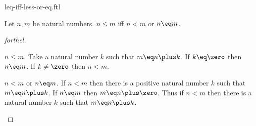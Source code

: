 \documentclass{stex}
\begin{document}
\begin{smodule}{leq-iff-less-or-eq.ftl}


\begin{proposition}[forthel,id=LeqCharacterizationProp]
  Let $n, m$ be natural numbers.
  $n \leq m$ iff $n \less m$ or $n \eq m$.
\end{proposition}
\begin{proof}[forthel]
  \begin{case}{$n \leq m$.}
    Take a natural number $k$ such that $m \eq n \plus k$.
    If $k \eq \zero$ then $n \eq m$. If $k \neq \zero$ then $n \less m$.
  \end{case}

  \begin{case}{$n \less m$ or $n \eq m$.}
    If $n \less m$ then there is a positive natural number $k$ such that $m \eq n \plus k$.
    If $n \eq m$ then $m \eq n \plus \zero$.
    Thus if $n \less m$ then there is a natural number $k$ such that $m \eq n \plus k$.
  \end{case}
\end{proof}

\end{smodule}
\end{document}
